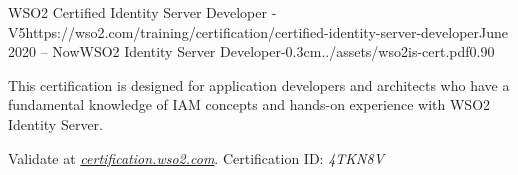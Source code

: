\documentclass{mycv}
\begin{document}
	\vspace{0.75cm}
	
	\begin{EntryDatedLogo}{WSO2 Certified Identity Server
			Developer - V5}{https://wso2.com/training/certification/certified-identity-server-developer}{June 2020 -- Now}{WSO2 Identity Server Developer}{-0.3cm}{../assets/wso2is-cert.pdf}{0.90}
		\begin{Itemize}
			\item This certification is designed for application developers and architects who have a fundamental knowledge of IAM concepts and hands-on experience with WSO2 Identity Server. 
			\item Validate at \href{https://certification.wso2.com}{\textit{certification.wso2.com}}. Certification ID: \textit{4TKN8V}
		\end{Itemize}
	\end{EntryDatedLogo}

	
	

\end{document}
